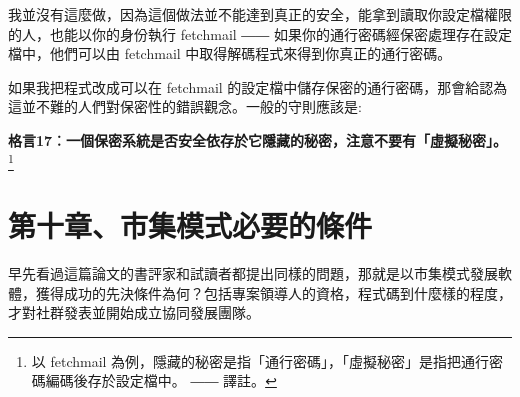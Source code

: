 \documentclass[12pt, a5paper]{book}
\begin{document}
我並沒有這麼做，因為這個做法並不能達到真正的安全，能拿到讀取你設定檔權限的人，也能以你的身份執行
fetchmail ―― 如果你的通行密碼經保密處理存在設定檔中，他們可以由
fetchmail 中取得解碼程式來得到你真正的通行密碼。

如果我把程式改成可以在 fetchmail
的設定檔中儲存保密的通行密碼，那會給認為這並不難的人們對保密性的錯誤觀念。一般的守則應該是:

\textbf{格言17︰一個保密系統是否安全依存於它隱藏的秘密，注意不要有「虛擬秘密」。}\footnote{以
  fetchmail
  為例，隱藏的秘密是指「通行密碼」，「虛擬秘密」是指把通行密碼編碼後存於設定檔中。
  ―― 譯註。}

\newpage
\section{第十章、市集模式必要的條件}\label{ux7b2cux5341ux7ae0ux5e02ux96c6ux6a21ux5f0fux5fc5ux8981ux7684ux689dux4ef6}

早先看過這篇論文的書評家和試讀者都提出同樣的問題，那就是以市集模式發展軟體，獲得成功的先決條件為何？包括專案領導人的資格，程式碼到什麼樣的程度，才對社群發表並開始成立協同發展團隊。
\end{document}
